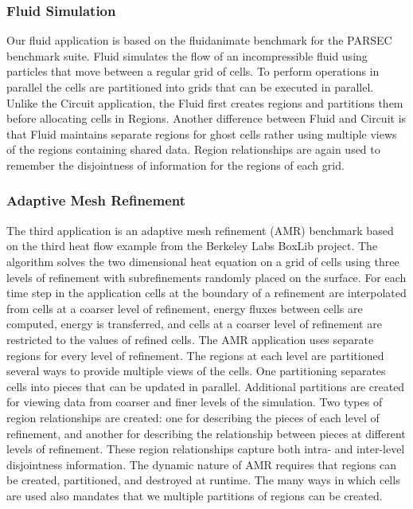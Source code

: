 \subsubsection{Fluid Simulation}
\label{subsec:fluid}
Our fluid application is based on the fluidanimate benchmark for the PARSEC benchmark
suite\cite{bienia11benchmarking}.  Fluid simulates the flow of an incompressible fluid
using particles that move between a regular grid of cells.  To perform operations in 
parallel the cells are partitioned into grids that can be executed in parallel.  Unlike
the Circuit application, the Fluid first creates regions and partitions them before
allocating cells in Regions.  Another difference between Fluid and Circuit is that Fluid
maintains separate regions for ghost cells rather using multiple views of
the regions containing shared data.  Region relationships are again used to remember
the disjointness of information for the regions of each grid.

\subsubsection{Adaptive Mesh Refinement}
\label{subsec:amr}
The third application is an adaptive mesh refinement (AMR) benchmark based on the third heat flow
example from the Berkeley Labs BoxLib project\cite{BoxLib}.  The algorithm solves the two
dimensional heat equation on a grid of cells using three levels of refinement with subrefinements
randomly placed on the surface.  For each time step in the application cells at the boundary of
a refinement are interpolated from cells at a coarser level of refinement, energy fluxes between
cells are computed, energy is transferred, and cells at a coarser level of refinement are restricted
to the values of refined cells.  The AMR application uses separate regions for every level of
refinement.  The regions at each level are partitioned several ways to provide multiple views of
the cells.  One partitioning separates cells into pieces that can be updated in
parallel.  Additional partitions are created for viewing data from coarser and finer levels of
the simulation.  Two types of region relationships are created: one for describing the pieces of
each level of refinement, and another for describing the relationship between pieces at different
levels of refinement.  These region relationships capture both intra- and inter-level disjointness
information.  The dynamic nature of AMR requires that regions can be created, partitioned,
and destroyed at runtime.  The many ways in which cells are used also mandates that we multiple
partitions of regions can be created.

